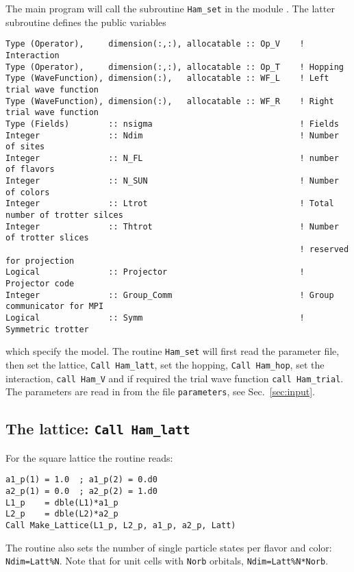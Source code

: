 The main program will call the subroutine   \texttt{Ham\_set} in the module .
The latter  subroutine  defines the  public variables
\begin{lstlisting}[style=fortran]
Type (Operator),     dimension(:,:), allocatable :: Op_V    ! Interaction
Type (Operator),     dimension(:,:), allocatable :: Op_T    ! Hopping
Type (WaveFunction), dimension(:),   allocatable :: WF_L    ! Left trial wave function
Type (WaveFunction), dimension(:),   allocatable :: WF_R    ! Right trial wave function
Type (Fields)        :: nsigma                              ! Fields
Integer              :: Ndim	                            ! Number of sites
Integer              :: N_FL                                ! number of flavors
Integer              :: N_SUN	                            ! Number of colors 
Integer              :: Ltrot                               ! Total number of trotter silces
Integer              :: Thtrot                              ! Number of trotter slices 
                                                            ! reserved for projection
Logical              :: Projector                           ! Projector code
Integer              :: Group_Comm                          ! Group communicator for MPI
Logical              :: Symm                                ! Symmetric trotter 
\end{lstlisting}
which specify the model.  The  routine \texttt{Ham\_set}  will first  read the parameter file,  then set the lattice, \texttt{Call Ham\_latt},  set the hopping, \texttt{Call Ham\_hop},  
 set the interaction, 
\texttt{call Ham\_V}  and  if required the  trial wave function \texttt{call Ham\_trial}. 
The parameters are read in from the file \texttt{parameters}, see Sec.~\ref{sec:input}.

\subsection{The lattice:   \texttt{Call Ham\_latt} }

For the square lattice  the routine reads:
\begin{lstlisting}[style=fortran]
a1_p(1) = 1.0  ; a1_p(2) = 0.d0
a2_p(1) = 0.0  ; a2_p(2) = 1.d0
L1_p    = dble(L1)*a1_p
L2_p    = dble(L2)*a2_p
Call Make_Lattice(L1_p, L2_p, a1_p, a2_p, Latt)
\end{lstlisting}
The routine also sets the  number of single particle states per flavor and color:  \texttt{Ndim=Latt\%N}.     Note  that for unit cells with \texttt{Norb}   orbitals,  \texttt{Ndim=Latt\%N*Norb}. 
